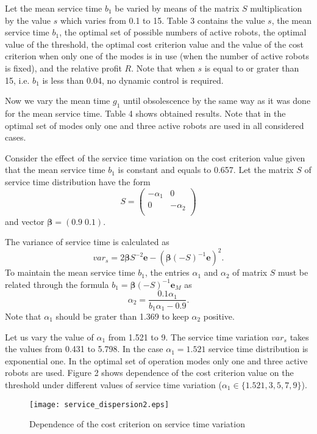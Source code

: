 \documentclass[11pt]{article}
\begin{document}
\vspace{4mm}


Let the mean service time $b_1$ be varied by means of the matrix $S$
multiplication by the value $s$ which varies from 0.1 to 15. Table 3
contains the value $s$, the mean service time $b_1$, the optimal set
of possible numbers of active robots, the optimal value of the
threshold, the optimal cost criterion value and the value of the
cost criterion when only one of the modes is in use (when the number
of active robots is fixed), and the relative profit $R$. Note that
when $s$ is equal to or grater than 15, i.e. $b_1$ is less than
0.04, no dynamic control is required.

Now we vary the mean time $g_1$ until obsolescence by the same way
as it was done for the mean service time. Table 4 shows obtained
results. Note that in the optimal set of modes only one and three
active robots are used in all considered cases.

Consider the effect of the service time variation on the cost
criterion value given that the mean service time $b_1$ is constant
and equals to 0.657. Let the matrix $S$ of service time distribution
have the form
$$S=\begin{pmatrix}
  -\alpha_1 & 0 \\
  0 & -\alpha_2 \\
\end{pmatrix}$$
and vector ${\boldsymbol {\boldsymbol \beta}} = (0.9\; 0.1)$.

The variance of service time is calculated as
$$var_s = 2{\boldsymbol {\boldsymbol \beta}} S^{-2}{\mathbf{e}} - ({\boldsymbol {\boldsymbol \beta}} (-S)^{-1}\mathbf{e})^2.$$
To maintain the mean service time $b_1$, the entries $\alpha_1$ and
$\alpha_2$ of matrix $S$ must be related through the formula
$b_1={\boldsymbol {\boldsymbol \beta}}(-S)^{-1}{ \mathbf{e}}_M$ as
$$\alpha_2 = \frac{0.1\alpha_1}{b_1\alpha_1-0.9}.$$
Note that $\alpha_1$ should be grater than 1.369 to keep $\alpha_2$
positive.

Let us vary the value of $\alpha_1$ from 1.521 to 9. The service
time variation $var_s$ takes the values from 0.431 to 5.798. In the
case $\alpha_1=1.521$ service time distribution is exponential one.
In the optimal set of operation modes only one and three active
robots are used. Figure 2 shows dependence of the cost criterion
value on the threshold under different values of service time
variation ($\alpha_1\in\{1.521, 3,5,7,9\}$).

\begin{figure}[htb]
\centering \texttt{[image: service\_dispersion2.eps]}\\
  \caption{Dependence of the cost criterion on service time variation}
\end{figure}
\end{document}
